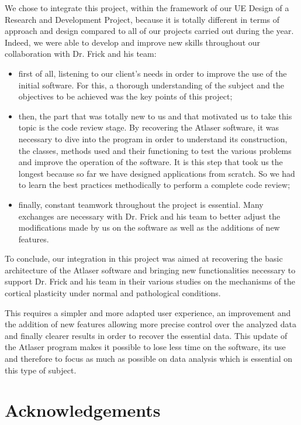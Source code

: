\documentclass[a4paper,12pt]{report}
\begin{document}
We chose to integrate this project, within the framework of our UE Design of a Research and Development Project, because it is totally different in terms of approach and design compared to all of our projects carried out during the year. Indeed, we were able to develop and improve new skills throughout our collaboration with Dr. Frick and his team:\vspace{0.2\baselineskip} 
\begin{itemize}
    \item first of all, listening to our client’s needs in order to improve the use of the initial software. For this, a thorough understanding of the subject and the objectives to be achieved was the key points of this project;
    \item then, the part that was totally new to us and that motivated us to take this topic is the code review stage. By recovering the Atlaser software, it was necessary to dive into the program in order to understand its construction, the classes, methods used and their functioning to test the various problems and improve the operation of the software. It is this step that took us the longest because so far we have designed applications from scratch. So we had to learn the best practices methodically to perform a complete code review;
    \item finally, constant teamwork throughout the project is essential. Many exchanges are necessary with Dr. Frick and his team to better adjust the modifications made by us on the software as well as the additions of new features.
\end{itemize}
\vspace{0.2\baselineskip} 

\indent To conclude, our integration in this project was aimed at recovering the basic architecture of the Atlaser software and bringing new functionalities necessary to support Dr. Frick and his team in their various studies on the mechanisms of the cortical plasticity under normal and pathological conditions.

This requires a simpler and more adapted user experience, an improvement and the addition of new features allowing more precise control over the analyzed data and finally clearer results in order to recover the essential data. This update of the Atlaser program makes it possible to lose less time on the software, its use and therefore to focus as much as possible on data analysis which is essential on this type of subject.

\chapter*{Acknowledgements}
\end{document}
